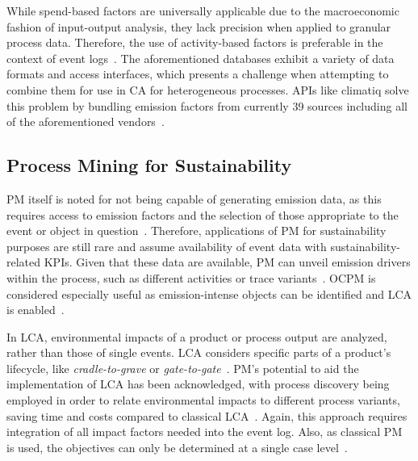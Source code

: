 While spend-based factors are universally applicable due to the macroeconomic fashion of input-output analysis,
they lack precision when applied to granular process data.
Therefore, the use of activity-based factors is preferable in the context of event logs~\cite{Recker10measuring}.
%
The aforementioned databases exhibit a variety of data formats and access interfaces, which presents a challenge when attempting to combine them for use in CA for heterogeneous processes.
APIs like climatiq solve this problem by bundling emission factors from currently 39 sources including all of the aforementioned vendors~\cite{climatiq24}.

\subsection*{Process Mining for Sustainability}
\label{sec:rw-pm4s}

PM itself is noted for not being capable of generating emission data,
as this requires access to emission factors and the selection of those appropriate to the event or object in question~\cite{Brehm22process}.
%
Therefore, applications of PM for sustainability purposes are still rare and assume availability of event data with sustainability-related KPIs.
Given that these data are available, PM can unveil emission drivers within the process, such as different activities or trace variants~\cite{Brehm22process,Graves23rethink}.
OCPM is considered especially useful as emission-intense objects can be identified and LCA is enabled~\cite{Graves23rethink}.

In LCA, environmental impacts of a product or process output are analyzed, rather than those of single events. LCA considers specific parts of a product's lifecycle, like \textit{cradle-to-grave} or \textit{gate-to-gate}~\cite{Ortmeier21framework}.
%
PM's potential to aid the implementation of LCA has been acknowledged, with process discovery being employed in order to relate environmental impacts to different process variants, saving time and costs compared to classical LCA~\cite{Ortmeier21framework}. Again, this approach requires integration of all impact factors needed into the event log. Also, as classical PM is used, the objectives can only be determined at a single case level~\cite{Ortmeier21framework}.


